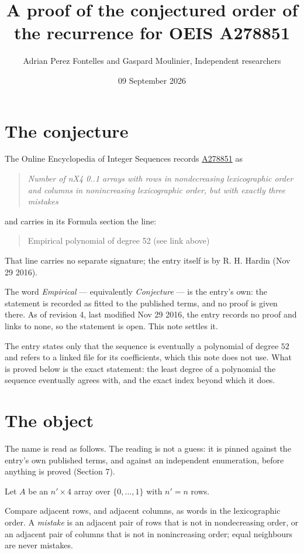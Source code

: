 \documentclass[11pt]{article}
\title{A proof of the conjectured order of the recurrence for OEIS A278851}
\author{Adrian Perez Fontelles and Gaspard Moulinier, Independent researchers}
\date{09 September 2026}
\theoremstyle{definition}
\begin{document}
\maketitle
\section{The conjecture}

The Online Encyclopedia of Integer Sequences records \href{https://oeis.org/A278851}{A278851} as

\begin{quote}\itshape Number of nX4 0..1 arrays with rows in nondecreasing lexicographic order and columns in nonincreasing lexicographic order, but with exactly three mistakes\end{quote}

and carries in its Formula section the line:

\begin{quote}\ttfamily Empirical polynomial of degree 52 (see link above)\end{quote}

That line carries no separate signature; the entry itself is by R. H. Hardin (Nov 29 2016).

The word {\itshape Empirical} --- equivalently {\itshape Conjecture} --- is the entry's own: the statement is recorded as fitted to the published terms, and no proof is given there. As of revision 4, last modified Nov 29 2016, the entry records no proof and links to none, so the statement is open. This note settles it.

The entry states only that the sequence is eventually a polynomial of degree $52$ and refers to a linked file for its coefficients, which this note does not use. What is proved below is the exact statement: the least degree of a polynomial the sequence eventually agrees with, and the exact index beyond which it does.

\section{The object}

The name is read as follows. The reading is not a guess: it is pinned against the entry's own published terms, and against an independent enumeration, before anything is proved (Section 7).

Let $A$ be an $n' \times 4$ array over $\{0,\dots,1\}$ with $n' = n$ rows.

Compare adjacent rows, and adjacent columns, as words in the lexicographic order. A {\itshape mistake} is an adjacent pair of rows that is not in nondecreasing order, or an adjacent pair of columns that is not in nonincreasing order; equal neighbours are never mistakes.
\end{document}
